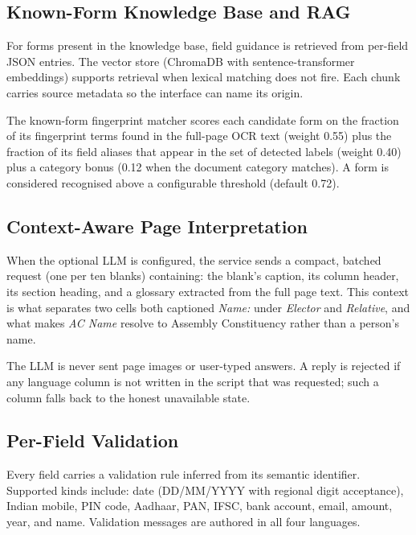 \documentclass[conference]{IEEEtran}
\begin{document}
\subsection{Known-Form Knowledge Base and RAG}

For forms present in the knowledge base, field guidance is retrieved from per-field JSON entries. The vector store (ChromaDB with sentence-transformer embeddings) supports retrieval when lexical matching does not fire. Each chunk carries source metadata so the interface can name its origin.

The known-form fingerprint matcher scores each candidate form on the fraction of its fingerprint terms found in the full-page OCR text (weight 0.55) plus the fraction of its field aliases that appear in the set of detected labels (weight 0.40) plus a category bonus (0.12 when the document category matches). A form is considered recognised above a configurable threshold (default 0.72).

\subsection{Context-Aware Page Interpretation}

When the optional LLM is configured, the service sends a compact, batched request (one per ten blanks) containing: the blank's caption, its column header, its section heading, and a glossary extracted from the full page text. This context is what separates two cells both captioned \textit{Name:} under \textit{Elector} and \textit{Relative}, and what makes \textit{AC Name} resolve to Assembly Constituency rather than a person's name.

The LLM is never sent page images or user-typed answers. A reply is rejected if any language column is not written in the script that was requested; such a column falls back to the honest unavailable state.

\subsection{Per-Field Validation}

Every field carries a validation rule inferred from its semantic identifier. Supported kinds include: date (DD/MM/YYYY with regional digit acceptance), Indian mobile, PIN code, Aadhaar, PAN, IFSC, bank account, email, amount, year, and name. Validation messages are authored in all four languages.

\end{document}
